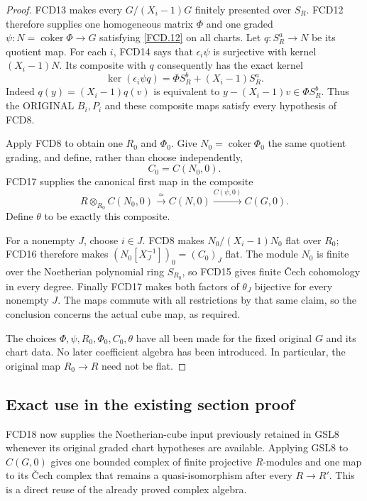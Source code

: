 \documentclass[11pt,a4paper]{article}
\numberwithin{equation}{section}
\theoremstyle{remark}\newtheorem{remark}[theorem]{Remark}
\begin{document}
\begin{proof}
FCD13 makes every $G/(X_i-1)G$ finitely presented over $S_R$.
FCD12 therefore supplies one homogeneous matrix $\Phi$ and
one graded $\psi:N=\operatorname{coker}\Phi\to G$ satisfying
\eqref{FCD.12} on all charts.
Let $q:S_R^a\to N$ be its quotient map.
For each $i$, FCD14 says that $\epsilon_i\psi$ is surjective
with kernel $(X_i-1)N$.  Its composite with $q$ consequently
has the exact kernel
\[
 \ker(\epsilon_i\psi q)=\Phi S_R^b+(X_i-1)S_R^a.
\]
Indeed $q(y)=(X_i-1)q(v)$ is equivalent to
$y-(X_i-1)v\in\Phi S_R^b$.  Thus the ORIGINAL $B_i,P_i$
and these composite maps satisfy every hypothesis of FCD8.

Apply FCD8 to obtain one $R_0$ and $\Phi_0$.  Give
$N_0=\operatorname{coker}\Phi_0$ the same quotient grading,
and define, rather than choose independently,
\[
 C_0=C(N_0,0).
\]
FCD17 supplies the canonical first map in the composite
\[
 R\otimes_{R_0}C(N_0,0)
 \xrightarrow{\ \simeq\ } C(N,0)
 \xrightarrow{C(\psi,0)} C(G,0).
\]
Define $\theta$ to be exactly this composite.

For a nonempty $J$, choose $i\in J$.
FCD8 makes $N_0/(X_i-1)N_0$ flat over $R_0$; FCD16
therefore makes $(N_0[X_J^{-1}])_0=(C_0)_J$ flat.
The module $N_0$ is finite over the Noetherian polynomial ring
$S_{R_0}$, so FCD15 gives finite \v Cech cohomology in every
degree.  Finally FCD17 makes both factors of $\theta_J$
bijective for every nonempty $J$.  The maps commute with all
restrictions by that same claim, so the conclusion concerns
the actual cube map, as required.

The choices $\Phi,\psi,R_0,\Phi_0,C_0,\theta$ have all
been made for the fixed original $G$ and its chart data.
No later coefficient algebra has been introduced.  In particular,
the original map $R_0\to R$ need not be flat.
\end{proof}

\subsection{Exact use in the existing section proof}

FCD18 now supplies the Noetherian-cube input previously retained in
GSL8 whenever its original graded chart hypotheses are available.
Applying GSL8 to $C(G,0)$ gives one bounded complex of finite
projective $R$-modules and one map to its \v Cech complex that
remains a quasi-isomorphism after every $R\to R'$.  This is a
direct reuse of the already proved complex algebra.
\end{document}
